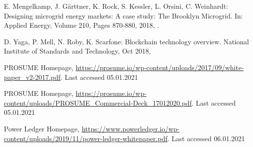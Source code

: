 \documentclass[runningheads]{llncs}
\begin{document}
\begin{thebibliography}{8}
E. Mengelkamp, J. Gärttner, K. Rock, S. Kessler, L. Orsini, C. Weinhardt: Designing microgrid energy markets: A case study: The Brooklyn Microgrid. In: Applied Energy, Volume 210, Pages 870-880, 2018, .

D. Yaga, P. Mell, N. Roby, K. Scarfone: Blockchain technology overview. National Institute of Standards and Technology, Oct 2018, 

PROSUME Homepage, \url{https://prosume.io/wp-content/uploads/2017/09/white-paper\_v2-2017.pdf}. Last accessed 05.01.2021

PROSUME Homepage, \url{https://prosume.io/wp-content/uploads/PROSUME\_Commercial-Deck\_17012020.pdf}. Last accessed 05.01.2021

Power Ledger Homepage, \url{https://www.powerledger.io/wp-content/uploads/2019/11/power-ledger-whitepaper.pdf}. Last accessed 06.01.2021

\end{thebibliography}
\end{document}
